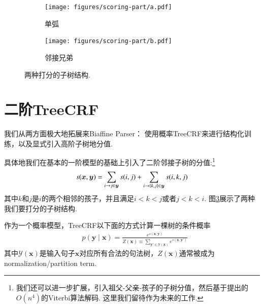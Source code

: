 \begin{figure}[tb]
    \centering
    \begin{subfigure}[b]{0.45\textwidth}
        \centering
        \texttt{[image: figures/scoring-part/a.pdf]}
        \caption{单弧}
        \label{fig:scoring-part-a}
    \end{subfigure}
    \begin{subfigure}[b]{0.45\textwidth}
        \centering
        \texttt{[image: figures/scoring-part/b.pdf]}
        \caption{邻接兄弟}
        \label{fig:scoring-part-b}
    \end{subfigure}
    \caption{两种打分的子树结构.}
    \label{fig:scoring-part}
\end{figure}



\section{二阶TreeCRF}\label{2o-tree-crf}
我们从两方面极大地拓展来Biaffine Parser：
使用概率TreeCRF来进行结构化训练，以及显式引入高阶子树地分值.

具体地我们在基本的一阶模型的基础上引入了二阶邻接子树的分值:\footnote{
    我们还可以进一步扩展，引入祖父-父亲-孩子的子树分值，然后基于\cite{koo-collins-2010-efficient}提出的$O(n^4)$的Viterbi算法解码.
    这里我们留待作为未来的工作.
}
\begin{equation}\label{eq:score-definition-2o}
    s(\boldsymbol{x}, \boldsymbol{y}) = \sum_{i\rightarrow j \in \boldsymbol{y}}s(i,j) + \sum_{
        i\rightarrow \{k,j\} \in \boldsymbol{y} %
    } s(i,k,j)
\end{equation}
其中$k$和$j$是$i$的两个相邻的孩子，并且满足$i < k < j$或者$j < k < i$.
图\ref{fig:scoring-part}展示了两种我们要打分的子树结构.

作为一个概率模型，TreeCRF以下面的方式计算一棵树的条件概率
\begin{equation}\label{eq:prob-labeled}
    \begin{split}
        & p(\boldsymbol{y}\mid\boldsymbol{x})  = \frac{e^{s(\boldsymbol{x},\boldsymbol{y})}}{Z(\boldsymbol{x}) \equiv \sum_{\boldsymbol{y'} \in \mathcal{Y}(\boldsymbol{x})} {e^{s(\boldsymbol{x},\boldsymbol{y'})}}}
    \end{split}
\end{equation}
其中$\mathcal{Y}(\boldsymbol{x})$是输入句子$\boldsymbol{x}$对应所有合法的句法树，$Z(\boldsymbol{x})$通常被成为normalization/partition term.

